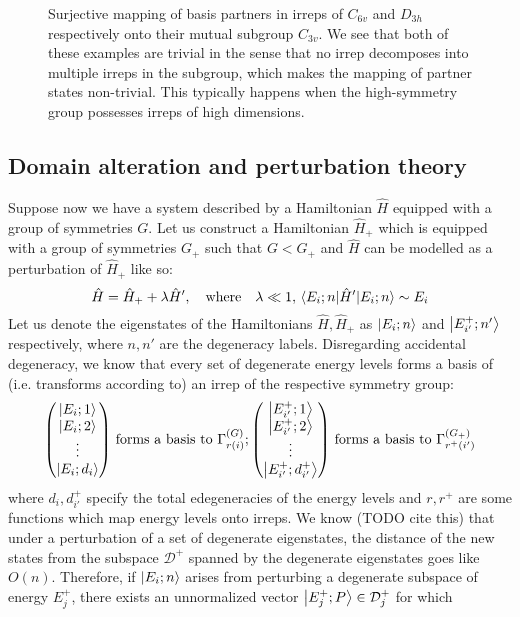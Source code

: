 \documentclass[12pt]{article}
\begin{document}
\begin{figure}[h]
\begin{center}
	\end{center}
	\caption{Surjective mapping of basis partners in irreps of $C_{6v}$ and $D_{3h}$ respectively onto their mutual subgroup $C_{3v}$. We see that both of these examples are trivial in the sense that no irrep decomposes into multiple irreps in the subgroup, which makes the mapping of partner states non-trivial. This typically happens when the high-symmetry group possesses irreps of high dimensions.}
	\label{fig:basis_vector_surjection}
	\end{figure}
	\subsection{Domain alteration and perturbation theory}
	Suppose now we have a system described by a Hamiltonian $\hat{H}$ equipped with a group of symmetries $G$. Let us construct a Hamiltonian $\hat{H}_+$ which is equipped with a group of symmetries $G_+$ such that $G<G_+$ and $\hat{H}$ can be modelled as a perturbation of $\hat{H}_+$ like so:
	$$\hat{H}=\hat{H}_+ + \lambda \hat{H}',\qq{where}\lambda\ll 1, \mel{E_i;n}{\hat{H}'}{E_i;n}\sim E_i$$
	Let us denote the eigenstates of the Hamiltonians $\hat{H},\hat{H}_+$ as $\ket{E_i;n}$ and $\ket{E^+_{i'};n'}$ respectively, where $n, n'$ are the degeneracy labels. Disregarding accidental degeneracy, we know that every set of degenerate energy levels forms a basis of (i.e. transforms according to) an irrep of the respective symmetry group:
	$$\mqty(\ket{E_i;1}\\\ket{E_i;2}\\\vdots\\\ket{E_i;d_i})\mbox{ forms a basis to }\Gamma^{(G)}_{r(i)}; \mqty(\ket{E^+_{i'};1}\\\ket{E^+_{i'};2}\\\vdots\\\ket{E^+_{i'};d^+_{i'}})\mbox{ forms a basis to }\Gamma^{\left(G_+\right)}_{r^+(i')}$$
	where $d_i, d^+_{i'}$ specify the total edegeneracies of the energy levels and $r,r^+$ are some functions which map energy levels onto irreps.
	We know (TODO cite this) that under a perturbation of a set of degenerate eigenstates, the distance of the new states from the subspace $\mathcal{D}^+$ spanned by the degenerate eigenstates goes like $O(n)$. Therefore, if $\ket{E_i;n}$ arises from perturbing a degenerate subspace of energy $E^+_j$, there exists an unnormalized vector $\ket{E^+_j;P}\in\mathcal{D}^+_j$ for which
\end{document}
